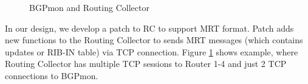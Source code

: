\begin{figure}
\centering
{}
\caption{BGPmon and Routing Collector}
\label{fig:routingcollector}
\end{figure}

In our design, we develop a patch to RC to support MRT format\cite{mrt}. Patch adds new functions to the Routing Collector to sends MRT messages (which contains updates or RIB-IN table) via TCP connection. Figure \ref{fig:routingcollector} shows example, where Routing Collector has multiple TCP sessions to Router 1-4 and just 2 TCP connections to BGPmon.  





